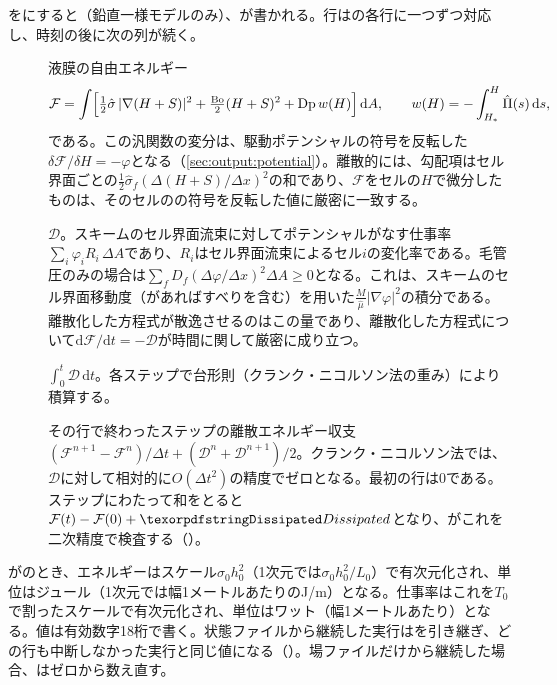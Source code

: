 \section{}
\label{sec:output:energy}

をにすると（鉛直一様モデルのみ）、が書かれる。行はの各行に一つずつ対応し、時刻の後に次の列が続く。
%
\begin{description}
  \item[] 液膜の自由エネルギー
    \begin{equation*}
      \mathcal F = \int\Bigl[\tfrac12\hat\sigma\,|\nabla(H+S)|^2
        + \tfrac{\mathrm{Bo}}{2}(H+S)^2 + \mathrm{Dp}\,w(H)\Bigr]\,\mathrm dA,
      \qquad w(H) = -\int_{H_*}^{H}\hat{\Pi}(s)\,\mathrm ds,
    \end{equation*}
    である。この汎関数の変分は、駆動ポテンシャルの符号を反転した$\delta\mathcal F/\delta H = -\varphi$となる（\cref{sec:output:potential}）。離散的には、勾配項はセル界面ごとの$\tfrac12\hat\sigma_f(\Delta(H+S)/\Delta x)^2$の和であり、$\mathcal F$をセルの$H$で微分したものは、そのセルのの符号を反転した値に厳密に一致する。
  \item[] $\mathcal D$。スキームのセル界面流束に対してポテンシャルがなす仕事率$\sum_i\varphi_i R_i\,\Delta A$であり、$R_i$はセル界面流束によるセル$i$の変化率である。毛管圧のみの場合は$\sum_f D_f(\Delta\varphi/\Delta x)^2\Delta A \ge 0$となる。これは、スキームのセル界面移動度（があればすべりを含む）を用いた$\frac{M}{\hat\mu}|\nabla\varphi|^2$の積分である。離散化した方程式が散逸させるのはこの量であり、離散化した方程式について$\mathrm d\mathcal F/\mathrm dt =
    -\mathcal D$が時間に関して厳密に成り立つ。
  \item[] $\int_0^t\mathcal D\,\mathrm dt$。各ステップで台形則（クランク・ニコルソン法の重み）により積算する。
  \item[] その行で終わったステップの離散エネルギー収支$(\mathcal F^{n+1} - \mathcal F^n)/\Delta t +
    (\mathcal D^n + \mathcal D^{n+1})/2$。クランク・ニコルソン法では、$\mathcal D$に対して相対的に$O(\Delta t^2)$の精度でゼロとなる。最初の行は0である。ステップにわたって和をとると$\mathcal F(t) - \mathcal F(0) + \code{Dissipated}$となり、がこれを二次精度で検査する（）。
\end{description}
%
がのとき、エネルギーはスケール$\sigma_0 h_0^2$（1次元では$\sigma_0 h_0^2/L_0$）で有次元化され、単位はジュール（1次元では幅1メートルあたりのJ/m）となる。仕事率はこれを$T_0$で割ったスケールで有次元化され、単位はワット（幅1メートルあたり）となる。値は有効数字18桁で書く。状態ファイルから継続した実行はを引き継ぎ、どの行も中断しなかった実行と同じ値になる（）。場ファイルだけから継続した場合、はゼロから数え直す。

